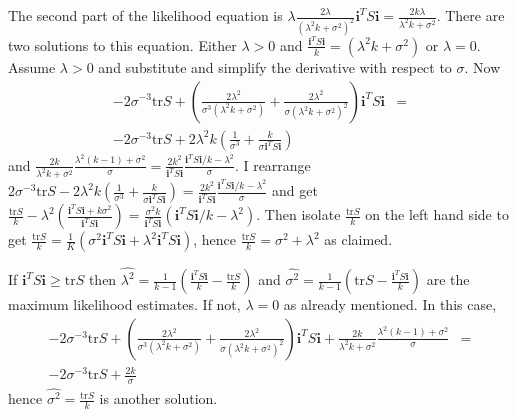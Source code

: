 \documentclass{article}
\makeatletter
\theoremstyle{plain}
\theoremstyle{plain}
\theoremstyle{definition}
\theoremstyle{remark}
\theoremstyle{definition}
\theoremstyle{plain}
\theoremstyle{plain}
\theoremstyle{definition}
\newenvironment{proof}[1][\protect\proofname]{\par
	\normalfont\topsep6\p@\@plus6\p@\relax
	\trivlist
	\itemindent\parindent
	\item[\hskip\labelsep\scshape #1]\ignorespaces
}{%
	\endtrivlist\@endpefalse
}
\providecommand{\proofname}{Proof}
\makeatother
\begin{document}
\begin{proof}[Proof of Theorem \ref{thm:ML}]
The second part of the likelihood equation is $\lambda$$\frac{2\lambda}{\left(\lambda^{2}k+\sigma^{2}\right)^{2}}\mathbf{i}^{T}S\mathbf{i}=\frac{2k\lambda}{\lambda^{2}k+\sigma^{2}}$.
There are two solutions to this equation. Either $\lambda>0$ and
$\frac{\mathbf{i}^{T}S\mathbf{i}}{k}=\left(\lambda^{2}k+\sigma^{2}\right)$
or $\lambda=0$. Assume $\lambda>0$ and substitute and simplify the
derivative with respect to $\sigma$. Now
\begin{eqnarray*}
-2\sigma^{-3}\textrm{tr}S+\left(\frac{2\lambda^{2}}{\sigma^{3}\left(\lambda^{2}k+\sigma^{2}\right)}+\frac{2\lambda^{2}}{\sigma\left(\lambda^{2}k+\sigma^{2}\right)^{2}}\right)\mathbf{i}^{T}S\mathbf{i} & =\\
-2\sigma^{-3}\textrm{tr}S+2\lambda^{2}k\left(\frac{1}{\sigma^{3}}+\frac{k}{\sigma\mathbf{i}^{T}S\mathbf{i}}\right)
\end{eqnarray*}
and $\frac{2k}{\lambda^{2}k+\sigma^{2}}\frac{\lambda^{2}\left(k-1\right)+\sigma^{2}}{\sigma}=\frac{2k^{2}}{\mathbf{i}^{T}S\mathbf{i}}\frac{\mathbf{i}^{T}S\mathbf{i}/k-\lambda^{2}}{\sigma}$.
I rearrange $2\sigma^{-3}\textrm{tr}S-2\lambda^{2}k\left(\frac{1}{\sigma^{3}}+\frac{k}{\sigma\mathbf{i}^{T}S\mathbf{i}}\right)=\frac{2k^{2}}{\mathbf{i}^{T}S\mathbf{i}}\frac{\mathbf{i}^{T}S\mathbf{i}/k-\lambda^{2}}{\sigma}$
and get $\frac{\textrm{tr}S}{k}-\lambda^{2}\left(\frac{\mathbf{i}^{T}S\mathbf{i}+k\sigma^{2}}{\mathbf{i}^{T}S\mathbf{i}}\right)=\frac{\sigma^{2}k}{\mathbf{i}^{T}S\mathbf{i}}\left(\mathbf{i}^{T}S\mathbf{i}/k-\lambda^{2}\right)$.
Then isolate $\frac{\textrm{tr}S}{k}$ on the left hand side to get
$\frac{\textrm{tr}S}{k}=\frac{1}{K}\left(\sigma^{2}\mathbf{i}^{T}S\mathbf{i}+\lambda^{2}\mathbf{i}^{T}S\mathbf{i}\right)$,
hence $\frac{\textrm{tr}S}{k}=\sigma^{2}+\lambda^{2}$ as claimed.

If $\mathbf{i}^{T}S\mathbf{i}\geq\textrm{tr}S$ then $\widehat{\lambda^{2}}=\frac{1}{k-1}\left(\frac{\mathbf{i}^{T}S\mathbf{i}}{k}-\frac{\textrm{tr}S}{k}\right)$
and $\widehat{\sigma^{2}}=\frac{1}{k-1}\left(\textrm{tr}S-\frac{\mathbf{i}^{T}S\mathbf{i}}{k}\right)$
are the maximum likelihood estimates. If not, $\lambda=0$ as already
mentioned. In this case,
\begin{eqnarray*}
-2\sigma^{-3}\textrm{tr}S+\left(\frac{2\lambda^{2}}{\sigma^{3}\left(\lambda^{2}k+\sigma^{2}\right)}+\frac{2\lambda^{2}}{\sigma\left(\lambda^{2}k+\sigma^{2}\right)^{2}}\right)\mathbf{i}^{T}S\mathbf{i}+\frac{2k}{\lambda^{2}k+\sigma^{2}}\frac{\lambda^{2}\left(k-1\right)+\sigma^{2}}{\sigma} & =\\
-2\sigma^{-3}\textrm{tr}S+\frac{2k}{\sigma}
\end{eqnarray*}
hence $\widehat{\sigma^{2}}=\frac{\textrm{tr}S}{k}$ is another solution.


\end{proof}
\end{document}
